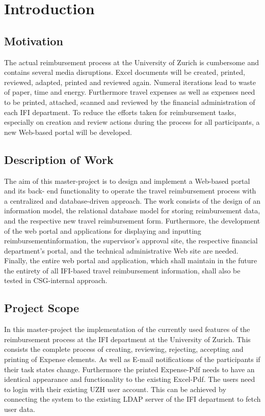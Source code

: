 \chapter{Introduction}

\section{Motivation}

The actual reimbursement process at the University of Zurich is cumbersome and contains several media disruptions. Excel documents will be created, printed, reviewed, adapted, printed and reviewed again. Numeral iterations lead to waste of paper, time and energy. Furthermore travel expenses as well as expenses need to be printed, attached, scanned and reviewed by the financial administration of each IFI \cite{ifi} department. To reduce the efforts taken for reimbursement tasks, especially on creation and review actions during the process for all participants, a new Web-based portal will be developed.

\section{Description of Work}

The aim of this master-project is to design and implement a Web-based portal and its back- end functionality to operate the travel reimbursement process with a centralized and database-driven approach. The work consists of the design of an information model, the relational database model for storing reimbursement data, and the respective new travel reimbursement form. Furthermore, the development of the web portal and applications for displaying and inputting reimbursementinformation, the supervisor’s approval site, the respective financial department’s portal, and the technical administrative Web site are needed. Finally, the entire web portal and application, which shall maintain in the future the entirety of all IFI-based travel reimbursement information, shall also be tested in CSG-internal approach.


\section{Project Scope}

In this master-project the implementation of the currently used features of the reimbursement process at the IFI \cite{ifi} department at the University of Zurich. This consists the complete process of creating, reviewing, rejecting, accepting and printing of Expense elements. As well as E-mail notifications of the participants if their task states change. Furthermore the printed Expense-Pdf needs to have an identical appearance and functionality to the existing Excel-Pdf. The users need to login with their existing UZH user account. This can be achieved by connecting the system to the existing LDAP server of the IFI department to fetch user data.  